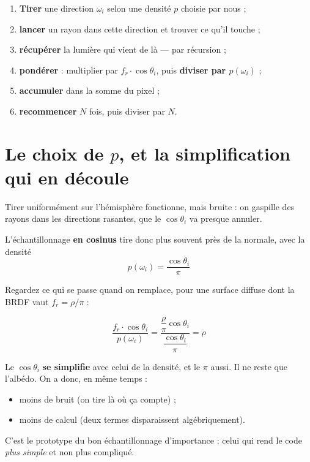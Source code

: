 \begin{nkretenir}
\begin{enumerate}
  \item \textbf{Tirer} une direction $\omega_i$ selon une densité $p$ choisie
        par nous ;
  \item \textbf{lancer} un rayon dans cette direction et trouver ce qu'il
        touche ;
  \item \textbf{récupérer} la lumière qui vient de là — par récursion ;
  \item \textbf{pondérer} : multiplier par $f_r \cdot \cos\theta_i$, puis
        \textbf{diviser par $p(\omega_i)$} ;
  \item \textbf{accumuler} dans la somme du pixel ;
  \item \textbf{recommencer} $N$ fois, puis diviser par $N$.
\end{enumerate}
\end{nkretenir}

\section{Le choix de $p$, et la simplification qui en découle}

Tirer uniformément sur l'hémisphère fonctionne, mais bruite : on gaspille des
rayons dans les directions rasantes, que le $\cos\theta_i$ va presque annuler.

L'échantillonnage \textbf{en cosinus} tire donc plus souvent près de la normale,
avec la densité
\[ p(\omega_i) = \frac{\cos\theta_i}{\pi} \]

Regardez ce qui se passe quand on remplace, pour une surface diffuse dont la
BRDF vaut $f_r = \rho/\pi$ :

\[ \frac{f_r \cdot \cos\theta_i}{p(\omega_i)}
 = \frac{\dfrac{\rho}{\pi}\cos\theta_i}{\dfrac{\cos\theta_i}{\pi}}
 = \rho \]

\begin{nkretenir}
Le $\cos\theta_i$ \textbf{se simplifie} avec celui de la densité, et le $\pi$
aussi. Il ne reste que l'albédo. On a donc, en même temps :
\begin{itemize}
  \item moins de bruit (on tire là où ça compte) ;
  \item moins de calcul (deux termes disparaissent algébriquement).
\end{itemize}
C'est le prototype du bon échantillonnage d'importance : celui qui rend le
code \emph{plus simple} et non plus compliqué.
\end{nkretenir}

